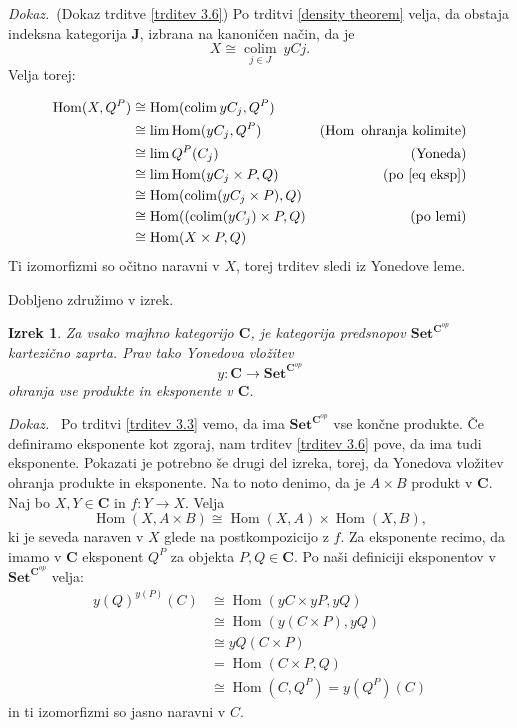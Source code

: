 \documentclass[12pt,a4paper]{book}
\theoremstyle{definition}
\theoremstyle{plain}
\newtheorem{izrek}[definicija]{Izrek}
\newenvironment{dokaz}{\emph{Dokaz.}\ }{\hspace{\fill}{$\Box$}}
\theoremstyle{definition}
\theoremstyle{remark}
\newcommand{\cat}[1]{\textbf{#1}}
\DeclareMathOperator{\Hom}{Hom}
\DeclareMathOperator{\colim}{colim}
\newcommand{\predsnop}[1]{\cat{Set}^{\cat{#1}^{op}}}
\begin{document}
\begin{dokaz}(Dokaz trditve \ref{trditev 3.6})
Po trditvi \ref{density theorem} velja, da obstaja indeksna kategorija $\cat{J}$, izbrana na kanoničen način, da je
$$ X \cong \underset{j \in J}{\colim}\> yCj.$$
Velja torej:

\begin{align*}
\Hom(X, Q^P) &\cong \Hom(\colim yC_j, Q^P) & \\
&\cong \lim\Hom(yC_j, Q^P) & (\Hom \text{ ohranja kolimite}) \\
&\cong \lim Q^P(C_j) & (\text{Yoneda}) \\
&\cong \lim \Hom(yC_j \times P, Q) & (\text{po \ref{eq eksp}}) \\
&\cong \Hom(\colim(yC_j \times P), Q) & \\
&\cong \Hom((\colim(yC_j) \times P, Q) & (\text{po lemi}) \\
&\cong \Hom(X \times P, Q)
\end{align*}
Ti izomorfizmi so očitno naravni v $X$, torej trditev sledi iz Yonedove leme.
\end{dokaz}

Dobljeno združimo v izrek.

\begin{izrek}
Za vsako majhno kategorijo $\cat{C}$, je kategorija predsnopov $\predsnop{C}$ kartezično zaprta. Prav tako Yonedova vložitev
$$y : \cat{C} \to \predsnop{C}$$
ohranja vse produkte in eksponente v $\cat{C}$.
\end{izrek}
\begin{dokaz}
Po trditvi \ref{trditev 3.3} vemo, da ima $\predsnop{C}$ vse končne produkte. Če definiramo eksponente kot zgoraj, nam trditev \ref{trditev 3.6} pove, da ima tudi eksponente.
Pokazati je potrebno še drugi del izreka, torej, da Yonedova vložitev ohranja produkte in eksponente. Na to noto denimo, da je $A \times B$ produkt v $\cat{C}$.
Naj bo $X,Y \in \cat{C}$ in $f : Y \to X$. Velja
$$ \Hom(X, A\times B) \cong \Hom(X, A) \times \Hom(X,B),$$
ki je seveda naraven v $X$ glede na postkompozicijo z $f$.
Za eksponente recimo, da imamo v $\cat{C}$ eksponent $Q^P$ za objekta $P,Q \in \cat{C}$. Po naši definiciji eksponentov v $\predsnop{C}$ velja:
\begin{align*}
y(Q)^{y(P)}(C) & \cong \Hom(yC \times yP, yQ) \\
&\cong \Hom(y(C \times P), yQ) \\
&\cong yQ(C \times P) \\
&= \Hom(C \times P, Q) \\
&\cong \Hom(C, Q^P) = y(Q^P)(C)
\end{align*}
in ti izomorfizmi so jasno naravni v $C$.
\end{dokaz}
\end{document}

